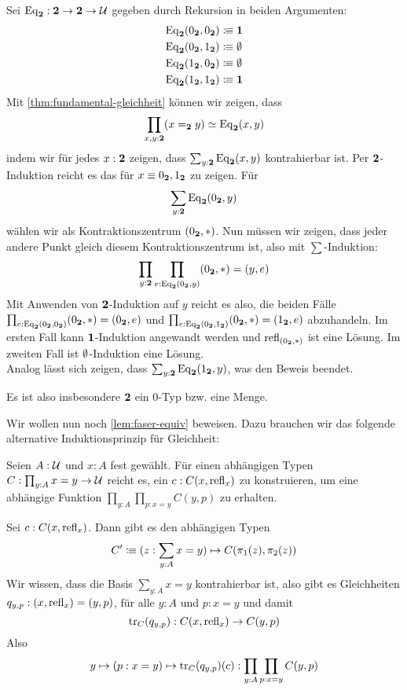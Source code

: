 \begin{beispiel}
  Sei $\mathrm{Eq}_{\mathbf{2}}:\mathbf{2}\to\mathbf{2}\to\mathcal{U}$ gegeben durch Rekursion in beiden Argumenten:
  \begin{align*}
    \mathrm{Eq}_{\mathbf{2}}(0_{\mathbf{2}},0_{\mathbf{2}})&\vcentcolon\mspace{-1.2mu}\equiv\mathbf{1} \\
    \mathrm{Eq}_{\mathbf{2}}(0_{\mathbf{2}},1_{\mathbf{2}})&\vcentcolon\mspace{-1.2mu}\equiv\emptyset \\
    \mathrm{Eq}_{\mathbf{2}}(1_{\mathbf{2}},0_{\mathbf{2}})&\vcentcolon\mspace{-1.2mu}\equiv\emptyset \\
    \mathrm{Eq}_{\mathbf{2}}(1_{\mathbf{2}},1_{\mathbf{2}})&\vcentcolon\mspace{-1.2mu}\equiv\mathbf{1} 
  \end{align*}
  Mit \cref{thm:fundamental-gleichheit} können wir zeigen, dass
  \[
    \prod_{x,y:\mathbf{2}}(x=_{\mathbf{2}} y)\simeq \mathrm{Eq}_{\mathbf{2}}(x,y)
  \]
  indem wir für jedes $x:\mathbf{2}$ zeigen, dass $\sum_{y:\mathbf{2}}\mathrm{Eq}_{\mathbf{2}}(x,y)$ kontrahierbar ist.
  Per $\mathbf{2}$-Induktion reicht es das für $x\equiv 0_{\mathbf{2}},1_{\mathbf{2}}$ zu zeigen.
  Für
  \[
    \sum_{y:\mathbf{2}}\mathrm{Eq}_{\mathbf{2}}(0_{\mathbf{2}},y)
  \]
  wählen wir als Kontraktionszentrum $(0_{\mathbf{2}},\ast)$. Nun müssen wir zeigen, dass jeder andere Punkt gleich diesem Kontraktionszentrum ist, also mit $\sum$-Induktion:
  \[
    \prod_{y:\mathbf{2}}\prod_{e:\mathrm{Eq}_{\mathbf{2}}(0_{\mathbf{2}},y)}(0_{\mathbf{2}},\ast)=(y,e)
  \]
  Mit Anwenden von $\mathbf{2}$-Induktion auf $y$ reicht es also, die beiden Fälle $\prod_{e:\mathrm{Eq}_{\mathbf{2}}(0_{\mathbf{2}},0_{\mathbf{2}})}(0_{\mathbf{2}},\ast)=(0_{\mathbf{2}},e)$ und $\prod_{e:\mathrm{Eq}_{\mathbf{2}}(0_{\mathbf{2}},1_{\mathbf{2}})}(0_{\mathbf{2}},\ast)=(1_{\mathbf{2}},e)$ abzuhandeln.
  Im ersten Fall kann $\mathbf{1}$-Induktion angewandt werden und $\mathrm{refl}_{(0_{\mathbf{2}},\ast)}$ ist eine Lösung. Im zweiten Fall ist $\emptyset$-Induktion eine Lösung. \\
  Analog lässt sich zeigen, dass $\sum_{y:\mathbf{2}}\mathrm{Eq}_{\mathbf{2}}(1_{\mathbf{2}},y)$, was den Beweis beendet.
\end{beispiel}

Es ist also insbesondere $\mathbf{2}$ ein 0-Typ bzw. eine Menge.


Wir wollen nun noch \cref{lem:faser-equiv} beweisen. Dazu brauchen wir das folgende alternative Induktionsprinzip für Gleichheit:

\begin{lemma}
  Seien $A:\mathcal{U}$ und $x:A$ fest gewählt. Für einen abhängigen Typen $C:\prod_{y:A}x=y \to\mathcal{U}$ reicht es, ein $c:C(x,\mathrm{refl}_x)$ zu konstruieren, um eine abhängige Funktion $\prod_{y:A}\prod_{p:x=y}C(y,p)$ zu erhalten.
\end{lemma}
\begin{beweis}
  Sei $c:C(x,\mathrm{refl}_x)$. Dann gibt es den abhängigen Typen
  \[
    C'\vcentcolon\mspace{-1.2mu}\equiv(z:\sum_{y:A}x=y)\mapsto C(\pi_1(z),\pi_2(z))
  \]
  Wir wissen, dass die Basis $\sum_{y:A}x=y$ kontrahierbar ist, also gibt es Gleichheiten $q_{y,p}:(x,\mathrm{refl}_x)=(y,p)$, für alle $y:A$ und $p:x=y$ und damit
  \[
    \mathrm{tr}_C(q_{y,p}):C(x,\mathrm{refl}_x)\to C(y,p)
  \]
  Also
  \[
    y\mapsto (p:x=y)\mapsto \mathrm{tr}_C(q_{y,p})(c):\prod_{y:A}\prod_{p:x=y}C(y,p)
  \]
\end{beweis}

